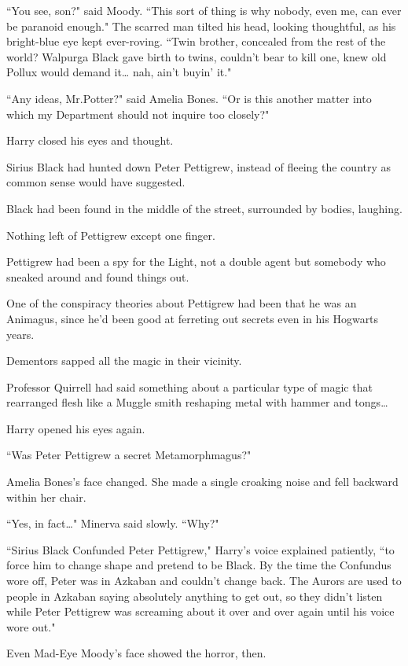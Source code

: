 ``You see, son?" said Moody. ``This sort of thing is why nobody, even me, can ever be paranoid enough." The scarred man tilted his head, looking thoughtful, as his bright-blue eye kept ever-roving. ``Twin brother, concealed from the rest of the world? Walpurga Black gave birth to twins, couldn't bear to kill one, knew old Pollux would demand it{\ldots} nah, ain't buyin' it."

``Any ideas, Mr.\?Potter?" said Amelia Bones. ``Or is this another matter into which my Department should not inquire too closely?"

Harry closed his eyes and thought.

Sirius Black had hunted down Peter Pettigrew, instead of fleeing the country as common sense would have suggested.

Black had been found in the middle of the street, surrounded by bodies, laughing.

Nothing left of Pettigrew except one finger.

Pettigrew had been a spy for the Light, not a double agent but somebody who sneaked around and found things out.

One of the conspiracy theories about Pettigrew had been that he was an Animagus, since he'd been good at ferreting out secrets even in his Hogwarts years.

Dementors sapped all the magic in their vicinity.

Professor Quirrell had said something about a particular type of magic that rearranged flesh like a Muggle smith reshaping metal with hammer and tongs{\ldots}

Harry opened his eyes again.

``Was Peter Pettigrew a secret Metamorphmagus?"

Amelia Bones's face changed. She made a single croaking noise and fell backward within her chair.

``Yes, in fact{\ldots}" Minerva said slowly. ``Why?"

``Sirius Black Confunded Peter Pettigrew," Harry's voice explained patiently, ``to force him to change shape and pretend to be Black. By the time the Confundus wore off, Peter was in Azkaban and couldn't change back. The Aurors are used to people in Azkaban saying absolutely anything to get out, so they didn't listen while Peter Pettigrew was screaming about it over and over again until his voice wore out."

Even Mad-Eye Moody's face showed the horror, then.

